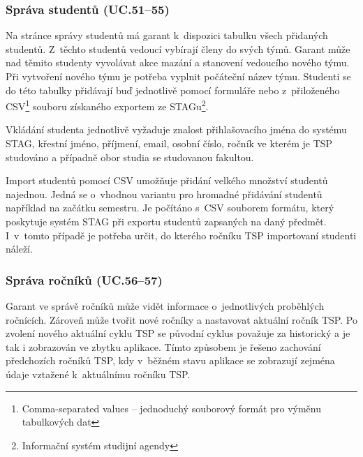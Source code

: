 \documentclass[czech,BP]{thesiskiv}
\begin{document}
			\subsubsection{Správa studentů (UC.51--55)}
			\par Na stránce správy studentů má garant k~dispozici tabulku všech přidaných studentů. Z~těchto studentů vedoucí vybírají členy do svých týmů. Garant může nad těmito studenty vyvolávat akce mazání a stanovení vedoucího nového týmu. Při vytvoření nového týmu je potřeba vyplnit počáteční název týmu. Studenti se do této tabulky přidávají buď jednotlivě pomocí formuláře nebo z~přiloženého CSV\footnote{Comma-separated values -- jednoduchý souborový formát pro výměnu tabulkových dat} souboru získaného exportem ze STAGu\footnote{Informační systém studijní agendy}.
			\par Vkládání studenta jednotlivě vyžaduje znalost přihlašovacího jména do systému STAG, křestní jméno, příjmení, email, osobní číslo, ročník ve kterém je TSP studováno a případně obor studia se studovanou fakultou.
			\par Import studentů pomocí CSV umožňuje přidání velkého množství studentů najednou. Jedná se o~vhodnou variantu pro hromadné přidávání studentů například na začátku semestru. Je počítáno s~CSV souborem formátu, který poskytuje systém STAG při exportu studentů zapsaných na daný předmět. I~v~tomto případě je potřeba určit, do kterého ročníku TSP importovaní studenti náleží.
			\subsubsection{Správa ročníků (UC.56--57)}
			\par Garant ve správě ročníků může vidět informace o~jednotlivých proběhlých ročnících. Zároveň může tvořit nové ročníky a nastavovat aktuální ročník TSP. Po zvolení nového aktuální cyklu TSP se původní cyklus považuje za historický a je tak i zobrazován ve zbytku aplikace. Tímto způsobem je řešeno zachování předchozích ročníků TSP, kdy v~běžném stavu aplikace se zobrazují zejména údaje vztažené k~aktuálnímu ročníku TSP.
\end{document}
